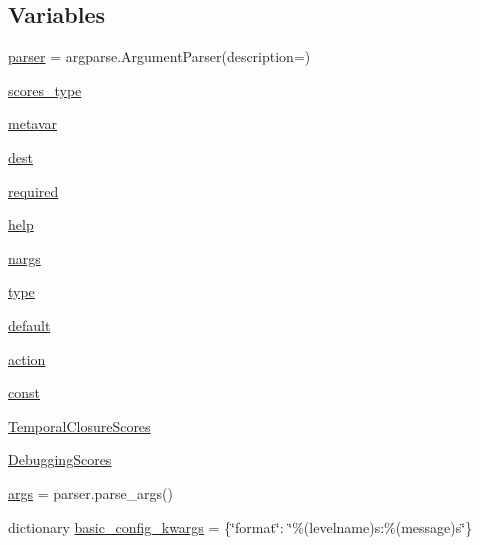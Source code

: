 \subsection*{Variables}
\begin{DoxyCompactItemize}
\item 
\hyperlink{namespacetask6_1_1anafora_1_1evaluate_a1f82050879d7c3a7e3fc2d245526b1fa}{parser} = argparse.\+Argument\+Parser(description=)
\item 
\hyperlink{namespacetask6_1_1anafora_1_1evaluate_aa641ae042502a113c0f501f5df0975a6}{scores\+\_\+type}
\item 
\hyperlink{namespacetask6_1_1anafora_1_1evaluate_a2f4bace274c0d300aadf00c8cc0fe7ea}{metavar}
\item 
\hyperlink{namespacetask6_1_1anafora_1_1evaluate_aacfa5970e313bb01d41b1831010ab77a}{dest}
\item 
\hyperlink{namespacetask6_1_1anafora_1_1evaluate_a4d6b92f3eb2a019f8ef2f8dccad07382}{required}
\item 
\hyperlink{namespacetask6_1_1anafora_1_1evaluate_a2ffd2347c1165c1f24bdf5963731e8b1}{help}
\item 
\hyperlink{namespacetask6_1_1anafora_1_1evaluate_a0058db76c6233e2252415176ffd8c7b7}{nargs}
\item 
\hyperlink{namespacetask6_1_1anafora_1_1evaluate_a3519332a7c827a94468fa547acc49de3}{type}
\item 
\hyperlink{namespacetask6_1_1anafora_1_1evaluate_acf5e5ddd6cdaef418849906e01fbd25e}{default}
\item 
\hyperlink{namespacetask6_1_1anafora_1_1evaluate_a166043d031f619c973aa46675d92bad4}{action}
\item 
\hyperlink{namespacetask6_1_1anafora_1_1evaluate_a42ad90b93501861dae02fd04d2cf5625}{const}
\item 
\hyperlink{namespacetask6_1_1anafora_1_1evaluate_aaafa0edeaf8d3b103df70571ac622018}{Temporal\+Closure\+Scores}
\item 
\hyperlink{namespacetask6_1_1anafora_1_1evaluate_a01861f0f9b3dc69f9a76f68546f62467}{Debugging\+Scores}
\item 
\hyperlink{namespacetask6_1_1anafora_1_1evaluate_aafc23fb00462236e5ab7d90b74d39b08}{args} = parser.\+parse\+\_\+args()
\item 
dictionary \hyperlink{namespacetask6_1_1anafora_1_1evaluate_ad38005ee0d5024b63bce4e399c01884d}{basic\+\_\+config\+\_\+kwargs} = \{\char`\"{}format\char`\"{}\+: \char`\"{}\%(levelname)s\+:\%(message)s\char`\"{}\}
\end{DoxyCompactItemize}


